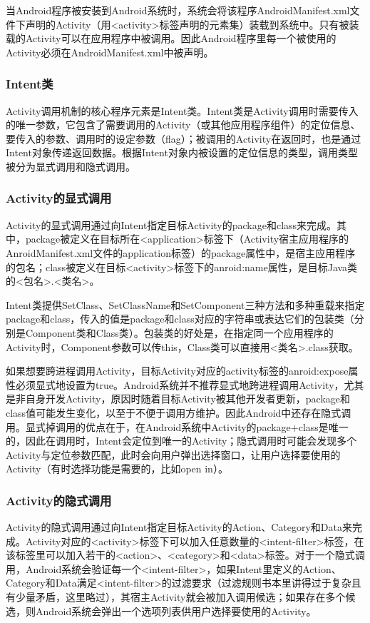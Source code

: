 \documentclass[UTF8]{ctexart}
\begin{document}
	当Android程序被安装到Android系统时，系统会将该程序AndroidManifest.xml文件下声明的Activity（用<activity>标签声明的元素集）装载到系统中。只有被装载的Activity可以在应用程序中被调用。因此Android程序里每一个被使用的Activity必须在AndroidManifest.xml中被声明。
		\subsubsection{Intent类}
		Activity调用机制的核心程序元素是Intent类。Intent类是Activity调用时需要传入的唯一参数，它包含了需要调用的Activity（或其他应用程序组件）的定位信息、要传入的参数、调用时的设定参数（flag）；被调用的Activity在返回时，也是通过Intent对象传递返回数据。根据Intent对象内被设置的定位信息的类型，调用类型被分为显式调用和隐式调用。
		\subsubsection{Activity的显式调用}
		Activity的显式调用通过向Intent指定目标Activity的package和class来完成。其中，package被定义在目标所在<application>标签下（Activity宿主应用程序的AnroidManifest.xml文件的application标签）的package属性中，是宿主应用程序的包名；class被定义在目标<activity>标签下的anroid:name属性，是目标Java类的<包名>.<类名>。
		
		Intent类提供SetClass、SetClassName和SetComponent三种方法和多种重载来指定package和class，传入的值是package和class对应的字符串或表达它们的包装类（分别是Component类和Class类）。包装类的好处是，在指定同一个应用程序的Activity时，Component参数可以传this，Class类可以直接用<类名>.class获取。
		
		如果想要跨进程调用Activity，目标Activity对应的activity标签的anroid:expose属性必须显式地设置为true。Android系统并不推荐显式地跨进程调用Activity，尤其是非自身开发Activity，原因时随着目标Activity被其他开发者更新，package和class值可能发生变化，以至于不便于调用方维护。因此Android中还存在隐式调用。显式掉调用的优点在于，在Android系统中Activity的package+class是唯一的，因此在调用时，Intent会定位到唯一的Activity；隐式调用时可能会发现多个Activity与定位参数匹配，此时会向用户弹出选择窗口，让用户选择要使用的Activity（有时选择功能是需要的，比如open in）。
		\subsubsection{Activity的隐式调用}
		Activity的隐式调用通过向Intent指定目标Activity的Action、Category和Data来完成。Activity对应的<activity>标签下可以加入任意数量的<intent-filter>标签，在该标签里可以加入若干的<action>、<category>和<data>标签。对于一个隐式调用，Android系统会验证每一个<intent-filter>，如果Intent里定义的Action、Category和Data满足<intent-filter>的过滤要求（过滤规则书本里讲得过于复杂且有少量矛盾，这里略过），其宿主Activity就会被加入调用候选；如果存在多个候选，则Android系统会弹出一个选项列表供用户选择要使用的Activity。
		
\end{document}
